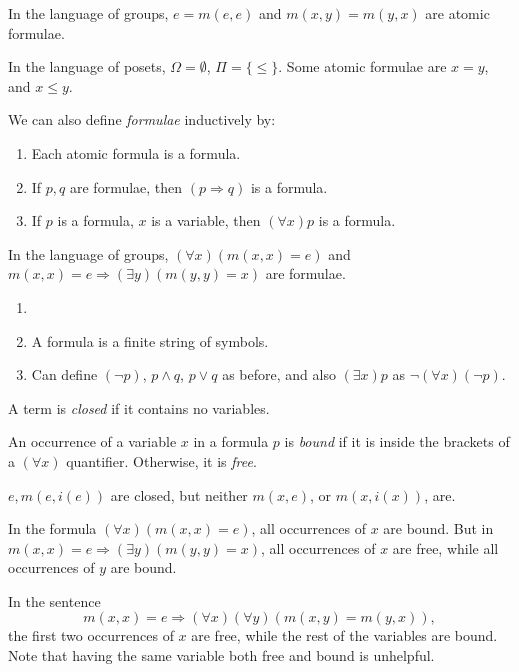 \documentclass[12pt]{article}
\begin{document}
\begin{exbox}
	In the language of groups, $e = m(e, e)$ and $m(x, y) = m(y, x)$ are atomic formulae.

	In the language of posets, $\Omega = \emptyset$, $\Pi = \{ \leq \}$. Some atomic formulae are $x = y$, and $x \leq y$.
\end{exbox}

We can also define \emph{formulae} inductively by:
\begin{enumerate}
	\item Each atomic formula is a formula.
	\item If $p, q$ are formulae, then $(p \Rightarrow q)$ is a formula.
	\item If $p$ is a formula, $x$ is a variable, then $(\forall x)p$ is a formula.
\end{enumerate}

\begin{exbox}
	In the language of groups, $(\forall x)(m(x, x) = e)$ and $m(x, x) = e \Rightarrow (\exists y)(m(y, y) = x)$ are formulae.
\end{exbox}

\begin{remark}
	\begin{enumerate}
		\item[]
		\item A formula is a finite string of symbols.
		\item Can define $(\neg p)$, $p \wedge q$, $p \vee q$ as before, and also $(\exists x)p$ as $\neg(\forall x)(\neg p)$.
	\end{enumerate}
\end{remark}

A term is \emph{closed} if it contains no variables.

An occurrence of a variable $x$ in a formula $p$ is \emph{bound} if it is inside the brackets of a $(\forall x)$ quantifier. Otherwise, it is \emph{free}.

\begin{exbox}
	$e, m(e, i(e))$ are closed, but neither $m(x, e)$, or $m(x, i(x))$, are.

	In the formula $(\forall x)(m(x, x) = e)$, all occurrences of $x$ are bound. But in $m(x, x) = e \Rightarrow (\exists y)(m(y,y)=x)$, all occurrences of $x$ are free, while all occurrences of $y$ are bound.

	In the sentence
	\[
	m(x, x) = e \Rightarrow (\forall x)(\forall y)(m(x,y) = m(y,x))
	,\]
	the first two occurrences of $x$ are free, while the rest of the variables are bound. Note that having the same variable both free and bound is unhelpful.
\end{exbox}
\end{document}
